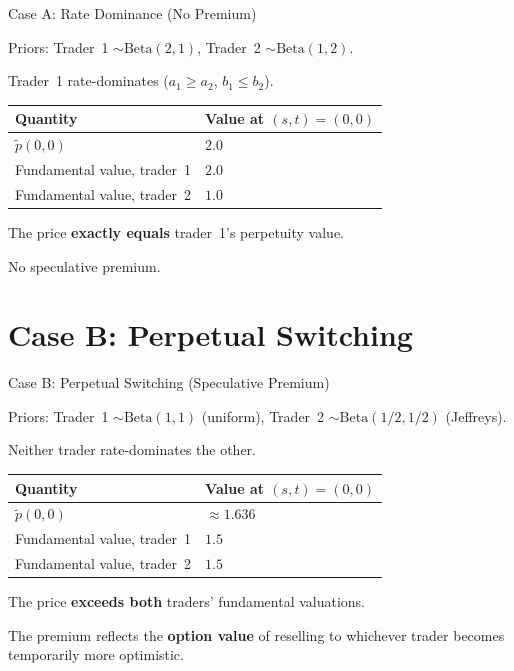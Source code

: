 \documentclass[11pt,aspectratio=169]{beamer}
\begin{document}
\begin{frame}{Case A: Rate Dominance (No Premium)}

Priors: Trader~1 $\sim\text{Beta}(2,1)$, \;
Trader~2 $\sim\text{Beta}(1,2)$.

\medskip

Trader~1 rate-dominates ($a_1\ge a_2$, $b_1\le b_2$).

\medskip

\begin{center}
\renewcommand{\arraystretch}{1.3}
\begin{tabular}{ll}
\toprule
\textbf{Quantity} & \textbf{Value at $(s,t)=(0,0)$} \\
\midrule
$\tilde p(0,0)$ & $2.0$ \\
Fundamental value, trader~1 & $2.0$ \\
Fundamental value, trader~2 & $1.0$ \\
\bottomrule
\end{tabular}
\end{center}

\medskip

The price \textbf{exactly equals} trader~1's perpetuity value.

No speculative premium.

\end{frame}


\section{Case B: Perpetual Switching}

\begin{frame}{Case B: Perpetual Switching (Speculative Premium)}

Priors: Trader~1 $\sim\text{Beta}(1,1)$ (uniform), \;
Trader~2 $\sim\text{Beta}(1/2,1/2)$ (Jeffreys).

\medskip

Neither trader rate-dominates the other.

\medskip

\begin{center}
\renewcommand{\arraystretch}{1.3}
\begin{tabular}{ll}
\toprule
\textbf{Quantity} & \textbf{Value at $(s,t)=(0,0)$} \\
\midrule
$\tilde p(0,0)$ & $\approx 1.636$ \\
Fundamental value, trader~1 & $1.5$ \\
Fundamental value, trader~2 & $1.5$ \\
\bottomrule
\end{tabular}
\end{center}

\medskip

The price \textbf{exceeds both} traders' fundamental valuations.

The premium reflects the \textbf{option value} of reselling to
whichever trader becomes temporarily more optimistic.

\end{frame}
\end{document}
